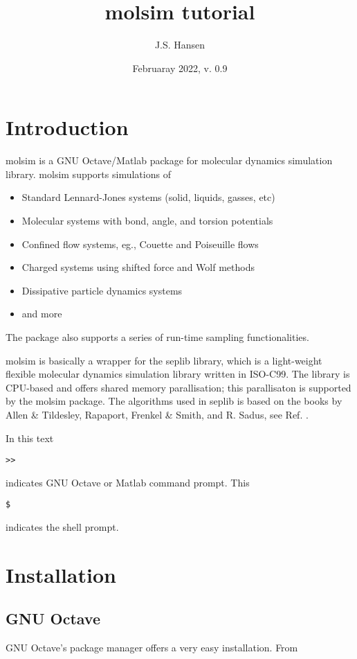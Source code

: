 \documentclass[11pt]{article}
\title{\textsf{molsim} tutorial}
\author{J.S. Hansen}
\date{Februaray 2022, v. 0.9}
\begin{document}
\maketitle

\section{Introduction}

\textsf{molsim} is a GNU Octave/Matlab package for molecular dynamics simulation
library. \textsf{molsim} supports simulations of
\begin{itemize}
\item Standard Lennard-Jones systems (solid, liquids, gasses, etc)
\item Molecular systems with bond, angle, and torsion potentials 
\item Confined flow systems, eg., Couette and Poiseuille flows
\item Charged systems using shifted force and Wolf methods
\item Dissipative particle dynamics systems
\item and more
\end{itemize}
The package also supports a series of run-time sampling functionalities.

\bigskip
\noindent \textsf{molsim} is basically a wrapper for the \textsf{seplib}
library, which is a light-weight flexible molecular dynamics simulation library
written in ISO-C99. The library is CPU-based and offers shared memory
parallisation; this parallisaton is supported by the \textsf{molsim}
package. The algorithms used in \textsf{seplib} is based on the books by Allen
\& Tildesley, Rapaport, Frenkel \& Smith, and R. Sadus, see
Ref. \cite{seplib:books}.

\bigskip
\noindent In this text
\begin{verbatim}
>> 
\end{verbatim}
indicates GNU Octave or Matlab command prompt. This 
\begin{verbatim}
$ 
\end{verbatim}
indicates the shell prompt.

\section{Installation}
\subsection{GNU Octave}
GNU Octave's package manager offers a very easy installation. From
\end{document}
